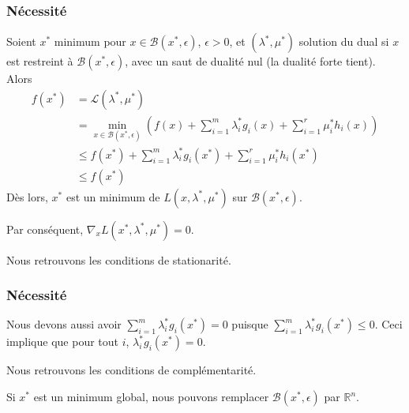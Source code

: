 \documentclass[usepdftitle=false]{beamer}
\def\cB{\mathcal{B}}
\def\cL{\mathcal{L}}
\def\RR{\mathbb{R}}
\begin{document}
\begin{frame}
\frametitle{Nécessité}

Soient $x^*$ minimum pour $x \in \cB(x^*,\epsilon)$, $\epsilon > 0$, et $(\lambda^*, \mu^*)$ solution du dual si $x$ est restreint à $\cB(x^*,\epsilon)$, avec un saut de dualité nul (la dualité forte tient).
Alors
\begin{align*}
f(x^*) &= \cL(\lambda^*, \mu^*) \\
&= \min_{x \in \cB(x^*,\epsilon)} \left( f(x) + \sum_{i = 1}^m \lambda_i^* g_i(x) + \sum_{i = 1}^r \mu_i^* h_i(x) \right) \\
& \leq f(x^*) + \sum_{i = 1}^m \lambda_i^* g_i(x^*) + \sum_{i = 1}^r \mu_i^* h_i(x^*) \\
& \leq f(x^*)
\end{align*}
Dès lors, $x^*$ est un minimum de $L(x, \lambda^*, \mu^*)$ sur $\cB(x^*,\epsilon)$.

\mbox{}

Par conséquent, $\nabla_x L(x^*, \lambda^*, \mu^*) = 0$.

\mbox{}

Nous retrouvons les conditions de stationarité.

\end{frame}

\begin{frame}
\frametitle{Nécessité}

Nous devons aussi avoir $\sum_{i = 1}^m \lambda_i^* g_i(x^*) = 0$ puisque $\sum_{i = 1}^m \lambda_i^* g_i(x^*) \leq 0$.
Ceci implique que pour tout $i$, $\lambda_i^* g_i(x^*) = 0$.

\mbox{}

Nous retrouvons les conditions de complémentarité.

\mbox{}

Si $x^*$ est un minimum global, nous pouvons remplacer $\cB(x^*,\epsilon)$ par $\RR^n$.

\end{frame}
\end{document}
